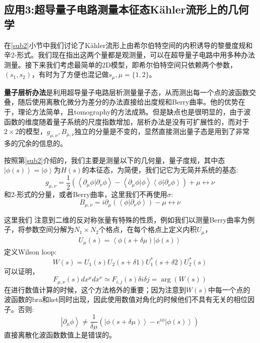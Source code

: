 \documentclass[supercite]{HustGraduPaper}
\newcommand{\ket}[1]{\left| #1 \right\rangle}
\newcommand{\bracket}[2]{\left\langle #1|#2 \right\rangle}
\begin{document}
   \subsection{应用3:超导量子电路测量本征态Kähler流形上的几何学}
   在\ref{sub2}小节中我们讨论了Kähler流形上由希尔伯特空间的内积诱导的黎曼度规和辛2-形式。我们现在指出这两个量都是观测量，可以在超导量子电路中用多种办法测量。接下来我们考虑最简单的2D模型，即希尔伯特空间只依赖两个参数，$(s_1,s_2)$，有时为了方便也混记做$s_\mu,\mu = \{1,2\}$。
   
   \textbf{量子层析办法}是利用超导量子电路层析测量量子态，从而测出每一个点的波函数交叠，随后使用离散化微分为差分的办法直接给出度规和Berry曲率\cite{fukui2005chern}。他的优势在于，理论方法简单，且tomography的方法成熟。但是缺点也是很明显的，由于波函数的维度随着量子系统的尺度指数增加，层析办法是没有可扩展性的，而对于$2\times 2$的模型，$g_{\mu,\nu}, B_{\mu,\nu}$独立的分量是不变的，显然直接测出量子态是用到了非常多的冗余的信息的。
   
   按照第\ref{sub2}介绍的，我们主要是测量以下的几何量，量子度规，其中态$\ket{\phi(s)} = \ket{\phi}$为$H(s)$的本征态，为简便，我们记它为无简并系统的基态:
   \begin{equation}
   g_{\mu,\nu} = \frac{1}{2}(\bracket{\partial_\mu \phi}{\partial_\nu \phi} - \bracket{\partial_\mu \phi}{\phi}\bracket{\phi}{\partial_\nu \phi}) + \mu \leftrightarrow \nu
   \end{equation}
   和2-形式的分量，或者Berry曲率，这里我们不再使用$\sigma$:
   \begin{equation}
   B_{\mu,\nu} = i\partial_\mu(\bracket{\phi}{\partial_\nu \phi} ) - \mu \leftrightarrow \nu
   \end{equation}
   
   这里我们
   注意到二维的反对称张量有特殊的性质，例如我们以测量Berry曲率为例子，将参数空间分解为$N_1 \times N_2$个格点，在每个格点上定义内积$U_\mu$，
   \begin{equation}
   \begin{aligned}
   U_\mu(s) = \bracket{\phi(s + \delta \mu)}{\phi(s)}
   \end{aligned}
   \end{equation}
   定义Wilson loop:
   \begin{equation}
   W(s) = U_1(s)U_2(s + \delta 1)U^*_1(s+\delta 2)U^*_2(s)
   \end{equation}
   可以证明，
   \begin{equation}
   F_{\mu,\nu}(s)dx^\mu dx^\nu \simeq F_{i,j}(s) \delta i \delta j = \arg(W(s))
   \end{equation}
   在进行数值计算的时候，这个方法格外的重要；因为注意到$W(s)$中每一个点的波函数的bra和ket同时出现，因此使用数值对角化的时候他们不具有无关的相位因子。否则:
   \begin{equation}
   \ket{\partial_\mu \phi} \ne \frac{1}{\delta \mu}(\ket{\phi(s + \delta \mu)} - e^{i\phi}\ket{\phi(s)})
   \end{equation}
   直接离散化波函数数值上是错误的。
   
\end{document}
